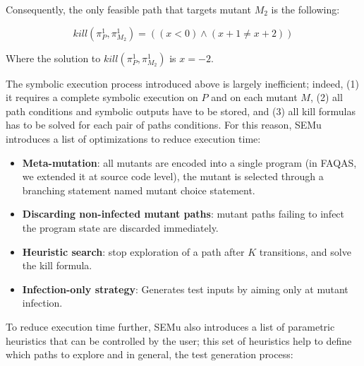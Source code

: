 Consequently, the only feasible path that targets mutant $M_2$ is the following:

\begin{equation}
	kill(\pi_{P}^{1}, \pi_{M_2}^{1}) = ((x < 0) \wedge (x + 1 \neq x + 2) )
\end{equation}

Where the solution to $kill(\pi_{P}^{1}, \pi_{M_2}^{1})$ is $x = -2$.

The symbolic execution process introduced above is largely inefficient; indeed,
(1) it requires a complete symbolic execution on $P$ and on each mutant $M$, (2) all path conditions and symbolic outputs have to be stored, and (3) all kill formulas has to be solved for each pair of paths conditions. 
For this reason, SEMu introduces a list of optimizations to reduce execution time:

\begin{itemize}
	\item \textbf{Meta-mutation}: all mutants are encoded into a single program (in FAQAS, we extended it at source code level), the mutant is selected through a branching statement named mutant choice statement.
	\item \textbf{Discarding non-infected mutant paths}: mutant paths failing to infect the program state are discarded immediately.
	\item \textbf{Heuristic search}: stop exploration of a path after $K$ transitions, and solve the kill formula.
	\item \textbf{Infection-only strategy}: Generates test inputs by aiming only at mutant infection.
\end{itemize}


To reduce execution time further, SEMu also introduces a list of parametric heuristics that can be controlled by the user; this set of heuristics help to define which paths to explore and in general, the test generation process:


